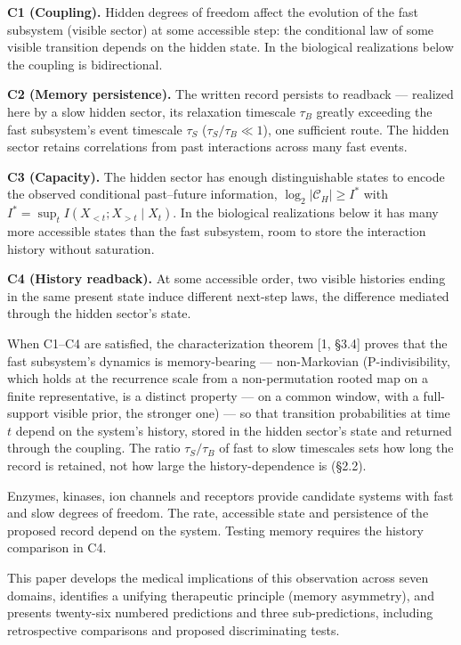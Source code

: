 \documentclass[
]{article}
\begin{document}
\textbf{C1 (Coupling).} Hidden degrees of freedom affect the evolution
of the fast subsystem (visible sector) at some accessible step: the
conditional law of some visible transition depends on the hidden state.
In the biological realizations below the coupling is bidirectional.

\textbf{C2 (Memory persistence).} The written record persists to
readback --- realized here by a slow hidden sector, its relaxation
timescale \(\tau_B\) greatly exceeding the fast subsystem's event
timescale \(\tau_S\) (\(\tau_S / \tau_B \ll 1\)), one sufficient route.
The hidden sector retains correlations from past interactions across
many fast events.

\textbf{C3 (Capacity).} The hidden sector has enough distinguishable
states to encode the observed conditional past--future information,
\(\log_2|\mathcal{C}_H| \geq I^*\) with
\(I^* = \sup_t I(X_{<t}; X_{>t} \mid X_t)\). In the biological
realizations below it has many more accessible states than the fast
subsystem, room to store the interaction history without saturation.

\textbf{C4 (History readback).} At some accessible order, two visible
histories ending in the same present state induce different next-step
laws, the difference mediated through the hidden sector's state.

When C1--C4 are satisfied, the characterization theorem {[}1, §3.4{]}
proves that the fast subsystem's dynamics is memory-bearing ---
non-Markovian (P-indivisibility, which holds at the recurrence scale
from a non-permutation rooted map on a finite representative, is a
distinct property --- on a common window, with a full-support visible
prior, the stronger one) --- so that transition probabilities at time
\(t\) depend on the system's history, stored in the hidden sector's
state and returned through the coupling. The ratio \(\tau_S / \tau_B\)
of fast to slow timescales sets how long the record is retained, not how
large the history-dependence is (§2.2).

Enzymes, kinases, ion channels and receptors provide candidate systems
with fast and slow degrees of freedom. The rate, accessible state and
persistence of the proposed record depend on the system. Testing memory
requires the history comparison in C4.

This paper develops the medical implications of this observation across
seven domains, identifies a unifying therapeutic principle (memory
asymmetry), and presents twenty-six numbered predictions and three
sub-predictions, including retrospective comparisons and proposed
discriminating tests.
\end{document}
